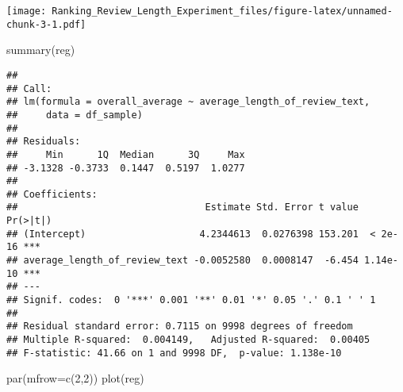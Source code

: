 \documentclass[
]{article}
\newenvironment{Shaded}{\begin{snugshade}}{\end{snugshade}}
\newcommand{\AttributeTok}[1]{\textcolor[rgb]{0.77,0.63,0.00}{#1}}
\newcommand{\DecValTok}[1]{\textcolor[rgb]{0.00,0.00,0.81}{#1}}
\newcommand{\FunctionTok}[1]{\textcolor[rgb]{0.00,0.00,0.00}{#1}}
\newcommand{\NormalTok}[1]{#1}
\newcommand{\OtherTok}[1]{\textcolor[rgb]{0.56,0.35,0.01}{#1}}
\newcommand{\SpecialCharTok}[1]{\textcolor[rgb]{0.00,0.00,0.00}{#1}}
\newcommand{\StringTok}[1]{\textcolor[rgb]{0.31,0.60,0.02}{#1}}
\begin{document}
\begin{Shaded}
\end{Shaded}

\texttt{[image: Ranking\_Review\_Length\_Experiment\_files/figure-latex/unnamed-chunk-3-1.pdf]}

\begin{Shaded}
\begin{Highlighting}[]
\FunctionTok{summary}\NormalTok{(reg)}
\end{Highlighting}
\end{Shaded}

\begin{verbatim}
## 
## Call:
## lm(formula = overall_average ~ average_length_of_review_text, 
##     data = df_sample)
## 
## Residuals:
##     Min      1Q  Median      3Q     Max 
## -3.1328 -0.3733  0.1447  0.5197  1.0277 
## 
## Coefficients:
##                                 Estimate Std. Error t value Pr(>|t|)    
## (Intercept)                    4.2344613  0.0276398 153.201  < 2e-16 ***
## average_length_of_review_text -0.0052580  0.0008147  -6.454 1.14e-10 ***
## ---
## Signif. codes:  0 '***' 0.001 '**' 0.01 '*' 0.05 '.' 0.1 ' ' 1
## 
## Residual standard error: 0.7115 on 9998 degrees of freedom
## Multiple R-squared:  0.004149,   Adjusted R-squared:  0.00405 
## F-statistic: 41.66 on 1 and 9998 DF,  p-value: 1.138e-10
\end{verbatim}

\begin{Shaded}
\begin{Highlighting}[]
\FunctionTok{par}\NormalTok{(}\AttributeTok{mfrow=}\FunctionTok{c}\NormalTok{(}\DecValTok{2}\NormalTok{,}\DecValTok{2}\NormalTok{))}
\FunctionTok{plot}\NormalTok{(reg)}
\end{Highlighting}
\end{Shaded}
\end{document}
